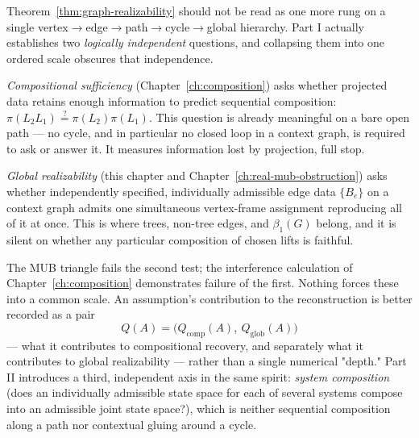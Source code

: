 \begin{remark}
\label{rem:two-axes}
Theorem~\ref{thm:graph-realizability} should not be read as one more rung on a
single vertex$\to$edge$\to$path$\to$cycle$\to$global hierarchy. Part I
actually establishes two \emph{logically independent} questions, and
collapsing them into one ordered scale obscures that independence.

\emph{Compositional sufficiency} (Chapter~\ref{ch:composition}) asks whether
projected data retains enough information to predict sequential composition:
$\pi(L_2L_1) \overset{?}{=} \pi(L_2)\pi(L_1)$. This question is already
meaningful on a bare open path — no cycle, and in particular no closed loop
in a context graph, is required to ask or answer it. It measures information
lost by projection, full stop.

\emph{Global realizability} (this chapter and Chapter~\ref{ch:real-mub-obstruction})
asks whether independently specified, individually admissible edge data
$\{B_e\}$ on a context graph admits one simultaneous vertex-frame assignment
reproducing all of it at once. This is where trees, non-tree edges, and
$\beta_1(G)$ belong, and it is silent on whether any particular composition of
chosen lifts is faithful.

The MUB triangle fails the second test; the interference calculation of
Chapter~\ref{ch:composition} demonstrates failure of the first. Nothing forces
these into a common scale. An assumption's contribution to the reconstruction
is better recorded as a pair
\begin{equation}
Q(A) = \big(Q_{\mathrm{comp}}(A),\ Q_{\mathrm{glob}}(A)\big)
\end{equation}
— what it contributes to compositional recovery, and separately what it
contributes to global realizability — rather than a single numerical "depth."
Part II introduces a third, independent axis in the same spirit: \emph{system
composition} (does an individually admissible state space for each of several
systems compose into an admissible joint state space?), which is neither
sequential composition along a path nor contextual gluing around a cycle.
\end{remark}
